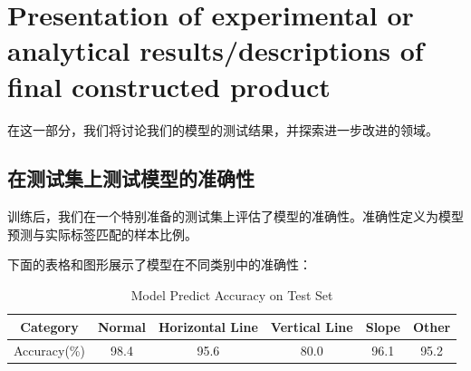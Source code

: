 \section{Presentation of experimental or analytical results/descriptions of final constructed product}

在这一部分，我们将讨论我们的模型的测试结果，并探索进一步改进的领域。

\subsection{在测试集上测试模型的准确性}

训练后，我们在一个特别准备的测试集上评估了模型的准确性。准确性定义为模型预测与实际标签匹配的样本比例。

下面的表格和图形展示了模型在不同类别中的准确性：


\begin{table}[H]
    \centering
    \caption{Model Predict Accuracy on Test Set}
    \begin{tabular}{c*{5}{c}}
        \toprule
        Category & Normal & Horizontal Line & Vertical Line & Slope & Other \\
        \midrule
        Accuracy(\%) & 98.4 & 95.6 & 80.0 & 96.1 & 95.2 \\
        \bottomrule
    \end{tabular}
    \label{tab:model_accuracy}
\end{table}

